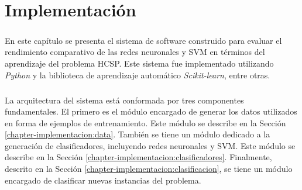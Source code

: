 \chapter{Implementación} \label{chapter-implementation}

\paragraph{} En este capítulo se presenta el sistema de software construido para evaluar el rendimiento comparativo de las redes neuronales y SVM en términos del aprendizaje del problema HCSP.
Este sistema fue implementado utilizando \textit{Python} y la biblioteca de aprendizaje automático \textit{Scikit-learn}, entre otras.

\paragraph{} La arquitectura del sistema está conformada por tres componentes fundamentales.
El primero es el módulo encargado de generar los datos utilizados en forma de ejemplos de entrenamiento.
Este módulo se describe en la Sección \ref{chapter-implementacion:data}.
También se tiene un módulo dedicado a la generación de clasificadores, incluyendo redes neuronales y SVM.
Este módulo se describe en la Sección \ref{chapter-implementacion:clasificadores}.
Finalmente, descrito en la Sección \ref{chapter-implementacion:clasificacion}, se tiene un módulo encargado de clasificar nuevas instancias del problema.






